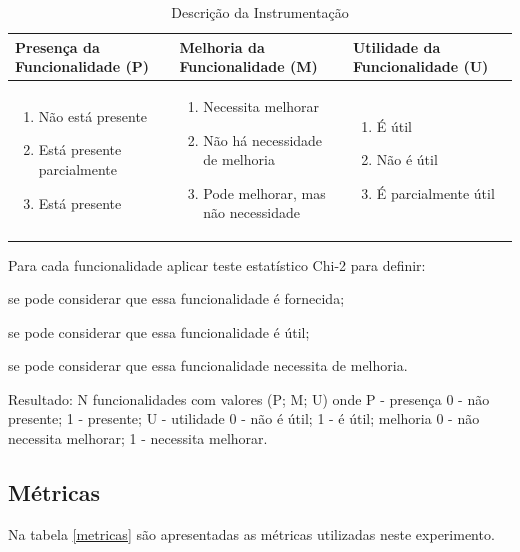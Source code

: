\begin{table}[ht]
	\centering
	\caption{Descrição da Instrumentação}
	\label{instrumentacao}
	\begin{tabular}{|p{5cm}| p{5cm} | p{5cm}|}
		\hline
		Presença da Funcionalidade (P) & Melhoria da Funcionalidade (M) & Utilidade da Funcionalidade (U)\\
		\hline
		\begin{enumerate}
			\item Não está presente
			\item Está presente parcialmente
			\item Está presente
		\end{enumerate} & 
		\begin{enumerate}
			\item Necessita melhorar
			\item Não há necessidade de melhoria
			\item Pode melhorar, mas não necessidade
		\end{enumerate} &
		\begin{enumerate}
			\item É útil
			\item Não é útil
			\item É parcialmente útil
		\end{enumerate}\\
		\hline
		
	\end{tabular}
\end{table}

Para cada funcionalidade aplicar teste estatístico Chi-2 para definir:

se pode considerar que essa funcionalidade é fornecida;

se pode considerar que essa funcionalidade é útil;

se pode considerar que essa funcionalidade necessita de melhoria.

Resultado: N funcionalidades com valores (P; M; U) onde P - presença {0 - não presente; 1 - presente}; U - utilidade {0 - não é útil; 1 - é útil}; melhoria {0 - não necessita melhorar; 1 - necessita melhorar}.

\subsection{Métricas}

Na tabela \ref{metricas} são apresentadas as métricas utilizadas neste experimento.


